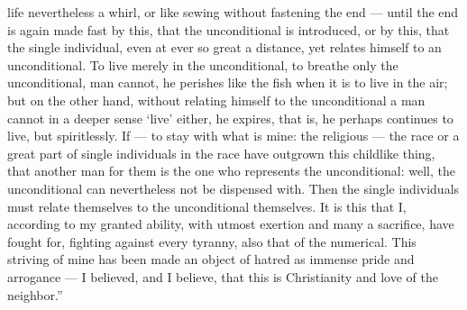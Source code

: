 \documentclass[12pt,a4paper,openany]{book}
\begin{document}
life nevertheless a whirl, or like sewing without fastening the
end --- until the end is again made fast by this, that the
unconditional is introduced, or by this, that the single individual, even
at ever so great a distance, yet relates himself to an
unconditional. To live merely in the unconditional, to breathe only
the unconditional, man cannot, he perishes
like the fish when it is to live in the air; but on the
other hand, without relating himself to the unconditional a
man cannot in a deeper sense `live' either, he
expires, that is, he perhaps continues to live,
but spiritlessly. If --- to stay with what is mine: the religious
--- the race or a great part of single individuals in the race
have outgrown this childlike thing, that another man for
them is the one who represents the unconditional: well,
the unconditional can nevertheless not be dispensed with. Then
the single individuals must relate themselves to the unconditional themselves.
It is this that I, according to my granted ability, with utmost exertion
and many a sacrifice, have fought for, fighting
against every tyranny, also that of the numerical.
This striving of mine has been made an object of hatred as immense
pride and arrogance --- I believed, and I believe, that this
is Christianity and love of the neighbor.''
\end{document}
